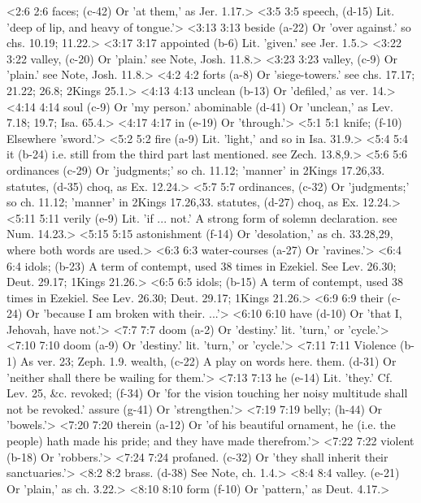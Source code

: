 <2:6 2:6  faces; (c-42)  Or 'at them,' as Jer. 1.17.>
<3:5 3:5  speech, (d-15)  Lit. 'deep of lip, and heavy of tongue.'>
<3:13 3:13  beside (a-22)  Or 'over against.' so chs. 10.19; 11.22.>
<3:17 3:17  appointed (b-6)  Lit. 'given.' see Jer. 1.5.>
<3:22 3:22  valley, (c-20) Or 'plain.' see Note, Josh. 11.8.>
<3:23 3:23  valley, (c-9)  Or 'plain.' see Note, Josh. 11.8.>
<4:2 4:2  forts (a-8)  Or 'siege-towers.' see chs. 17.17; 21.22; 26.8; 2Kings 25.1.>
<4:13 4:13  unclean (b-13)  Or 'defiled,' as ver. 14.>
<4:14 4:14  soul (c-9)  Or 'my person.'
  abominable (d-41)  Or 'unclean,' as Lev. 7.18; 19.7; Isa. 65.4.>
<4:17 4:17  in (e-19)  Or 'through.'>
<5:1 5:1  knife; (f-10)  Elsewhere 'sword.'>
<5:2 5:2  fire (a-9)  Lit. 'light,' and so in Isa. 31.9.>
<5:4 5:4  it (b-24)  i.e. still from the third part last mentioned. see Zech. 13.8,9.>
<5:6 5:6  ordinances (c-29) Or 'judgments;' so ch. 11.12; 'manner' in 2Kings 17.26,33.
  statutes, (d-35)  choq, as Ex. 12.24.>
<5:7 5:7  ordinances, (c-32)  Or 'judgments;' so ch. 11.12; 'manner' in 2Kings 17.26,33.
  statutes, (d-27)  choq, as Ex. 12.24.>
<5:11 5:11  verily (e-9)  Lit. 'if ... not.' A strong form of solemn declaration. see  Num. 14.23.>
<5:15 5:15  astonishment (f-14)  Or 'desolation,' as ch. 33.28,29, where both words are used.>
<6:3 6:3  water-courses (a-27)  Or 'ravines.'>
<6:4 6:4  idols; (b-23) A term of contempt, used 38 times in Ezekiel. See Lev. 26.30; Deut. 29.17; 1Kings 21.26.>
<6:5 6:5  idols; (b-15)  A term of contempt, used 38 times in Ezekiel. See Lev. 26.30;  Deut. 29.17; 1Kings 21.26.>
<6:9 6:9  their (c-24)  Or 'because I am broken with their. ...'>
<6:10 6:10  have (d-10)  Or 'that I, Jehovah, have not.'>
<7:7 7:7  doom (a-2) Or 'destiny.' lit. 'turn,' or 'cycle.'>
<7:10 7:10  doom (a-9)  Or 'destiny.' lit. 'turn,' or 'cycle.'>
<7:11 7:11  Violence (b-1)  As ver. 23; Zeph. 1.9.
  wealth, (c-22)  A play on words here.
  them. (d-31)  Or 'neither shall there be wailing for them.'>
<7:13 7:13  he (e-14)  Lit. 'they.' Cf. Lev. 25, &c.
  revoked; (f-34)  Or 'for the vision touching her noisy multitude shall not be  revoked.'
  assure (g-41)  Or 'strengthen.'>
<7:19 7:19  belly; (h-44)  Or 'bowels.'>
<7:20 7:20  therein (a-12)  Or 'of his beautiful ornament, he (i.e. the people) hath made  his pride; and they have made therefrom.'>
<7:22 7:22  violent (b-18)  Or 'robbers.'>
<7:24 7:24  profaned. (c-32)  Or 'they shall inherit their sanctuaries.'>
<8:2 8:2  brass. (d-38)  See Note, ch. 1.4.>
<8:4 8:4  valley. (e-21)  Or 'plain,' as ch. 3.22.>
<8:10 8:10  form (f-10)  Or 'pattern,' as Deut. 4.17.>
